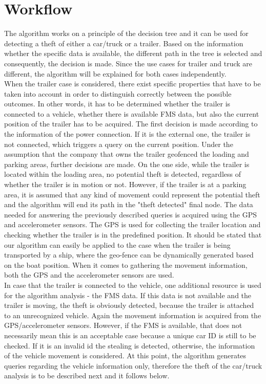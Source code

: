 \section{Workflow}
The algorithm works on a principle of the decision tree and it can be used for detecting a theft of either a car/truck or a trailer. Based on the information whether the specific data is available, the different path in the tree is selected and consequently, the decision is made. Since the use cases for trailer and truck are different, the algorithm will be explained for both cases independently.\\
When the trailer case is considered, there exist specific properties that have to be taken into account in order to distinguish correctly between the possible outcomes. In other words, it has to be determined whether the trailer is connected to a vehicle, whether there is available FMS data, but also the current position of the trailer has to be acquired. 
The first decision is made according to the information of the power connection. If it is the external one, the trailer is not connected, which triggers a query on the current position. Under the assumption that the company that owns the trailer geofenced the loading and parking areas, further decisions are made. On the one side, while the trailer is located within the loading area, no potential theft is detected, regardless of whether the trailer is in motion or not. However, if the trailer is at a parking area, it is assumed that any kind of movement could represent the potential theft and the algorithm will end its path in the "theft detected" final node. The data needed for answering the previously described queries is acquired using the GPS and accelerometer sensors. The GPS is used for collecting the trailer location and checking whether the trailer is in the predefined position. It should be stated that our algorithm can easily be applied to the case when the trailer is being transported by a ship, where the geo-fence can be dynamically generated based on the boat position. When it comes to gathering the movement information, both the GPS and the accelerometer sensors are used. \\
In case that the trailer is connected to the vehicle, one additional resource is used for the algorithm analysis - the FMS data. If this data is not available and the trailer is moving, the theft is obviously detected, because the trailer is attached to an unrecognized vehicle. Again the movement information is acquired from the GPS/accelerometer sensors. However, if the FMS is available, that does not necessarily mean this is an acceptable case because a unique car ID is still to be checked. If it is an invalid id the stealing is detected, otherwise, the information of the vehicle movement is considered. At this point, the algorithm generates queries regarding the vehicle information only, therefore the theft of the car/truck analysis is to be described next and it follows below.\\
